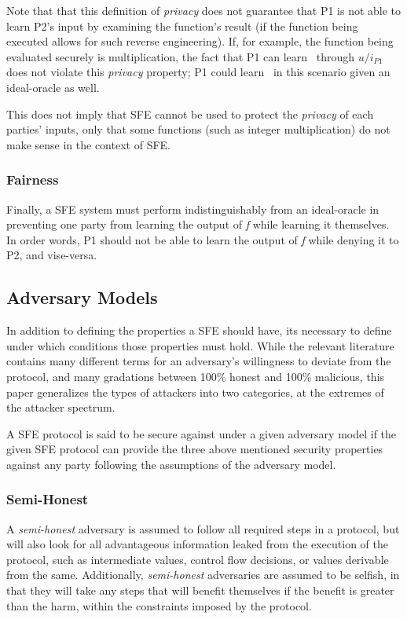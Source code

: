 Note that that this definition of \emph{privacy} does not guarantee that \ac{P1} is not able to learn \ac{P2}'s input by examining the function's result (if the function being executed allows for such reverse engineering).  If, for example, the function being evaluated securely is multiplication, the fact that \ac{P1} can learn \ptwoin\ through $u/i_{P1}$ does not violate this \emph{privacy} property; \ac{P1} could learn \ptwoin\ in this scenario given an ideal-oracle as well.

This does not imply that \ac{SFE} cannot be used to protect the \emph{privacy} of each parties' inputs, only that some functions (such as integer multiplication) do not make sense in the context of \ac{SFE}.

\subsubsection{Fairness}

Finally, a \ac{SFE} system must perform indistinguishably from an ideal-oracle in preventing one party from learning the output of \emph{f} while learning it themselves.  In order words, \ac{P1} should not be able to learn the output of \emph{f} while denying it to \ac{P2}, and vise-versa.

\subsection{Adversary Models}

In addition to defining the properties a \ac{SFE} should have, its necessary to define under which conditions those properties must hold.  While the relevant literature contains many different terms for an adversary's willingness to deviate from the protocol, and many gradations between 100\% honest and 100\% malicious, this paper generalizes the types of attackers into two categories, at the extremes of the attacker spectrum.

A \ac{SFE} protocol is said to be secure against under a given adversary model if the given \ac{SFE} protocol can provide the three above mentioned security properties against any party following the assumptions of the adversary model.

\subsubsection{Semi-Honest}

A \emph{semi-honest} adversary is assumed to follow all required steps in a protocol, but will also look for all advantageous information leaked from the execution of the protocol, such as intermediate values, control flow decisions, or values derivable from the same\cite{goldreich1998secure}.  Additionally, \emph{semi-honest} adversaries are assumed to be selfish, in that they will take any steps that will benefit themselves if the benefit is greater than the harm, within the constraints imposed by the protocol.



